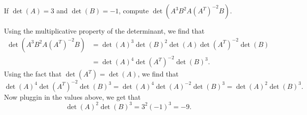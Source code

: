 \documentclass[12pt,a4paper]{article}
\theoremstyle{definition}
\begin{document}


\begin{question} If $\det(A) = 3$ and $\det(B) = -1$, compute $\det(A^3 B^2 A (A^T)^{-2} B)$. \end{question}
\begin{solution}
	Using the multiplicative property of the determinant, we find that
	\begin{align*}
		\det(A^3 B^2 A (A^T)^{-2} B ) &= \det(A)^3 \det(B)^2 \det(A) \det(A^T)^{-2} \det(B)\\
		&= \det(A)^4 \det(A^T)^{-2} \det(B)^3.
	\end{align*}
	Using the fact that $\det(A^T) = \det(A)$, we find that
	\[ \det(A)^4 \det(A^T)^{-2} \det(B)^3 = \det(A)^4 \det(A)^{-2} \det(B)^3 = \det(A)^2 \det(B)^3. \]
	Now pluggin in the values above, we get that
	\[ \det(A)^2 \det(B)^3 = 3^2 (-1)^3 = - 9. \]
\end{solution}
\end{document}
